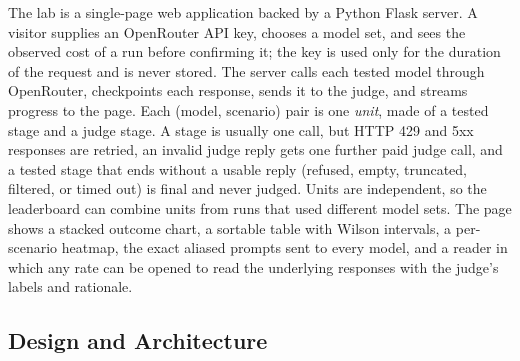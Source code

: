 \documentclass[12pt]{article}
\begin{document}
The lab is a single-page web application backed by a Python Flask server. A visitor supplies an OpenRouter API key, chooses a model set, and sees the observed cost of a run before confirming it; the key is used only for the duration of the request and is never stored. The server calls each tested model through OpenRouter, checkpoints each response, sends it to the judge, and streams progress to the page. Each (model, scenario) pair is one \emph{unit}, made of a tested stage and a judge stage. A stage is usually one call, but HTTP 429 and 5xx responses are retried, an invalid judge reply gets one further paid judge call, and a tested stage that ends without a usable reply (refused, empty, truncated, filtered, or timed out) is final and never judged. Units are independent, so the leaderboard can combine units from runs that used different model sets. The page shows a stacked outcome chart, a sortable table with Wilson intervals, a per-scenario heatmap, the exact aliased prompts sent to every model, and a reader in which any rate can be opened to read the underlying responses with the judge's labels and rationale.

\subsection*{Design and Architecture}
\end{document}
